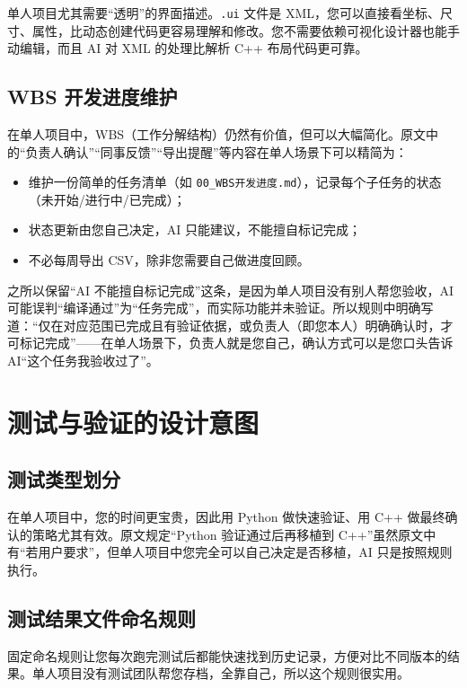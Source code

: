 单人项目尤其需要“透明”的界面描述。\texttt{.ui} 文件是 XML，您可以直接看坐标、尺寸、属性，比动态创建代码更容易理解和修改。您不需要依赖可视化设计器也能手动编辑，而且 AI 对 XML 的处理比解析 C++ 布局代码更可靠。

\subsection{WBS 开发进度维护}

在单人项目中，WBS（工作分解结构）仍然有价值，但可以大幅简化。原文中的“负责人确认”“同事反馈”“导出提醒”等内容在单人场景下可以精简为：

\begin{itemize}
	\item 维护一份简单的任务清单（如 \texttt{00\_WBS开发进度.md}），记录每个子任务的状态（未开始/进行中/已完成）；
	\item 状态更新由您自己决定，AI 只能建议，不能擅自标记完成；
	\item 不必每周导出 CSV，除非您需要自己做进度回顾。
\end{itemize}

之所以保留“AI 不能擅自标记完成”这条，是因为单人项目没有别人帮您验收，AI 可能误判“编译通过”为“任务完成”，而实际功能并未验证。所以规则中明确写道：“仅在对应范围已完成且有验证依据，或负责人（即您本人）明确确认时，才可标记完成”——在单人场景下，负责人就是您自己，确认方式可以是您口头告诉 AI“这个任务我验收过了”。

\section{测试与验证的设计意图}

\subsection{测试类型划分}

在单人项目中，您的时间更宝贵，因此用 Python 做快速验证、用 C++ 做最终确认的策略尤其有效。原文规定“Python 验证通过后再移植到 C++”虽然原文中有“若用户要求”，但单人项目中您完全可以自己决定是否移植，AI 只是按照规则执行。

\subsection{测试结果文件命名规则}

固定命名规则让您每次跑完测试后都能快速找到历史记录，方便对比不同版本的结果。单人项目没有测试团队帮您存档，全靠自己，所以这个规则很实用。


